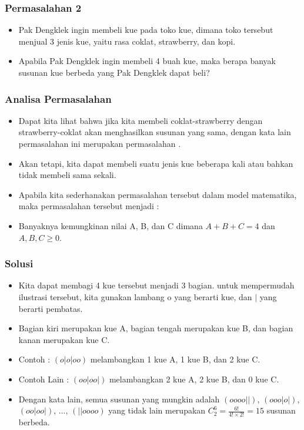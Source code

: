 \begin{frame}
\frametitle{Permasalahan 2}
\begin{itemize}
  \item Pak Dengklek ingin membeli kue pada toko kue, dimana toko tersebut menjual 3 jenis kue, yaitu rasa coklat, strawberry, dan kopi.
  \item Apabila Pak Dengklek ingin membeli 4 buah kue, maka berapa banyak susunan kue berbeda yang Pak Dengklek dapat beli?
\end{itemize}
\end{frame}

\begin{frame}
\frametitle{Analisa Permasalahan}
\begin{itemize}
  \item Dapat kita lihat bahwa jika kita membeli coklat-strawberry dengan strawberry-coklat akan menghasilkan susunan yang sama, dengan kata lain permasalahan ini merupakan permasalahan .
  \item Akan tetapi, kita dapat membeli suatu jenis kue beberapa kali atau bahkan tidak membeli sama sekali.
  \item Apabila kita sederhanakan permasalahan tersebut dalam model matematika, maka permasalahan tersebut menjadi :
  \item Banyaknya kemungkinan nilai A, B, dan C dimana $A + B + C = 4$ dan $A,B,C \geq 0$.
\end{itemize}
\end{frame}

\begin{frame}
\frametitle{Solusi}
\begin{itemize}
  \item Kita dapat membagi 4 kue tersebut menjadi 3 bagian. untuk mempermudah ilustrasi tersebut, kita gunakan lambang o yang berarti kue, dan $|$ yang berarti pembatas.
  \item Bagian kiri merupakan kue A, bagian tengah merupakan kue B, dan bagian kanan merupakan kue C.
  \item Contoh : $(o|o|oo)$ melambangkan 1 kue A, 1 kue B, dan 2 kue C.
  \item Contoh Lain : $(oo|oo|)$ melambangkan 2 kue A, 2 kue B, dan 0 kue C.
  \item Dengan kata lain, semua susunan yang mungkin adalah $(oooo||)$, $(ooo|o|)$, $(oo|oo|)$, ..., $(||oooo)$ yang tidak lain merupakan $C^{6}_{2} = \frac{6!}{4! \times 2!} = 15$ susunan berbeda.
\end{itemize}
\end{frame}

